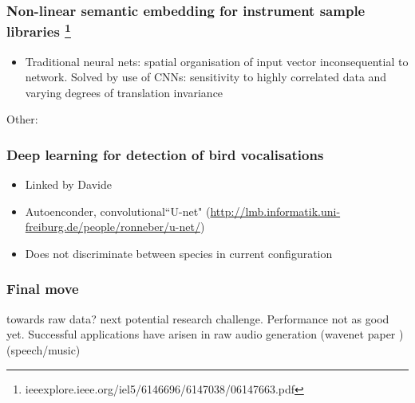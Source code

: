 \documentclass[12pt]{llncs}
\begin{document}
\subsubsection*{Non-linear semantic embedding for instrument sample libraries \cite{humphrey2011non} \footnote{ieeexplore.ieee.org/iel5/6146696/6147038/06147663.pdf}}
\begin{itemize}
	\item Traditional neural nets: spatial organisation of input vector inconsequential to network. Solved by use of CNNs: sensitivity to highly correlated data and varying degrees of translation invariance
\end{itemize}



Other:

\subsubsection*{Deep learning for detection of bird vocalisations \cite{potamitis2016deep}}
\begin{itemize}
	\item Linked by Davide 

	\item Autoenconder, convolutional``U-net" (\url{http://lmb.informatik.uni-freiburg.de/people/ronneber/u-net/})
	\item Does not discriminate between species in current configuration
\end{itemize}
	




\subsubsection{Final move}
towards raw data? next potential research challenge. Performance not as good yet. Successful applications have arisen in raw audio generation (wavenet paper \cite{van2016wavenet}) (speech/music)
\end{document}
